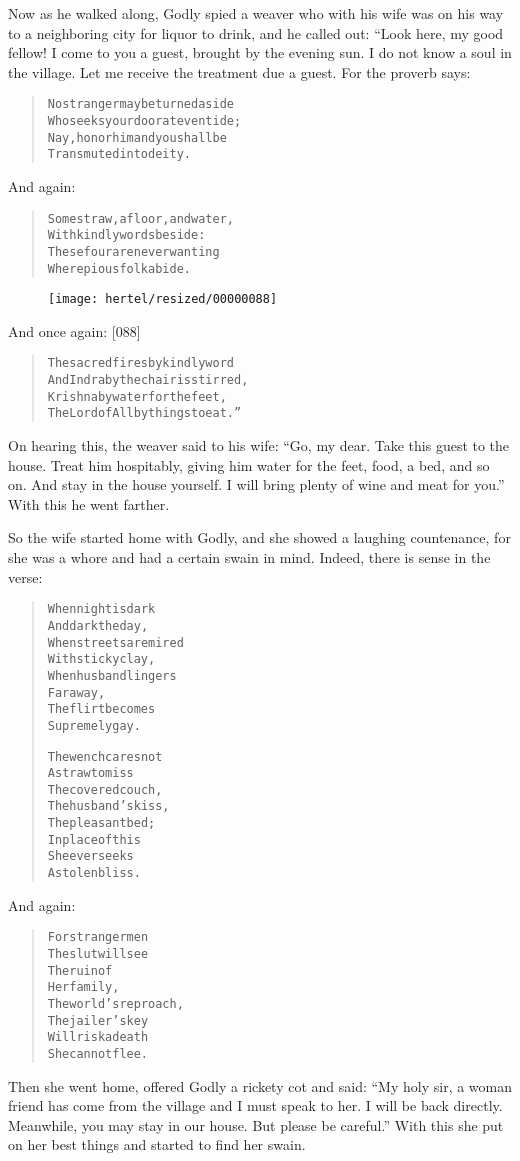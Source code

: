 \documentclass[article, twoside, 10pt]{memoir}
\renewenvironment{verbatim}{%
\begin{quote}%
\vskip -10pt%
\begin{alltt}\normalfont\small}{\end{alltt}%
\end{quote}%
\vskip -10pt
} %
\begin{document}
Now as he walked along, Godly spied a weaver who with his wife was
on his way to a neighboring city for liquor to drink, and he called
out: “Look here, my good fellow! I come to you a guest, brought by
the evening sun. I do not know a soul in the village. Let me
receive the treatment due a guest. For the proverb says:

\begin{verbatim}
No stranger may be turned aside
Who seeks your door at eventide;
Nay, honor him and you shall be
Transmuted into deity.
\end{verbatim}
And again:

\begin{verbatim}
Some straw, a floor, and water,
    With kindly words beside:
These four are never wanting
    Where pious folk abide.
\end{verbatim}
\begin{figure}[p]\texttt{[image: hertel/resized/00000088]}\end{figure}And once again: [088]

\begin{verbatim}
The sacred fires by kindly word
And Indra by the chair is stirred,
Krishna by water for the feet,
The Lord of All by things to eat.”
\end{verbatim}
On hearing this, the weaver said to his wife:
``Go, my dear. Take this guest to the house. Treat him hospitably, giving him water for the feet, food, a bed, and so on. And stay in the house yourself. I will bring plenty of wine and meat for you.''
With this he went farther.

So the wife started home with Godly, and she showed a laughing
countenance, for she was a whore and had a certain swain in mind.
Indeed, there is sense in the verse:

\begin{verbatim}
When night is dark
    And dark the day,
When streets are mired
    With sticky clay,
When husband lingers
    Far away,
The flirt becomes
    Supremely gay.

The wench cares not
    A straw to miss
The covered couch,
    The husband's kiss,
The pleasant bed;
    In place of this
She ever seeks
    A stolen bliss.
\end{verbatim}
And again:

\begin{verbatim}
For stranger men
    The slut will see
The ruin of
    Her family,
The world's reproach,
    The jailer's key{\textemdash}
Will risk a death
    She cannot flee.
\end{verbatim}
Then she went home, offered Godly a rickety cot and said:
``My holy sir, a woman friend has come from the village and I must speak to her. I will be back directly. Meanwhile, you may stay in our house. But please be careful.''
With this she put on her best things and started to find her
swain.
\end{document}
